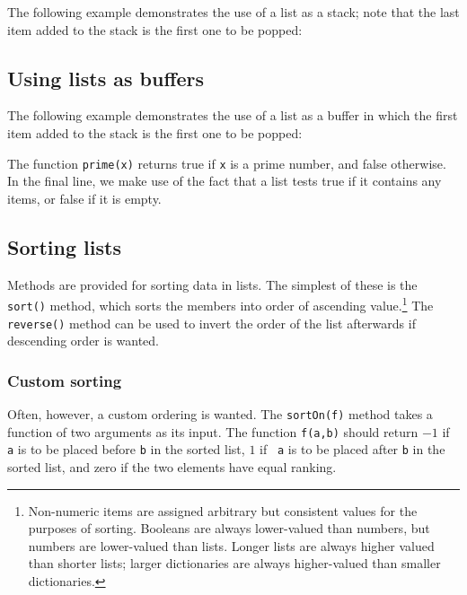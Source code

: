 The following example demonstrates the use of a list as a stack; note that the
last item added to the stack is the first one to be popped:

\vspace{3mm}

\vspace{3mm}

\subsection{Using lists as buffers}

The following example demonstrates the use of a list as a buffer in which the
first item added to the stack is the first one to be popped:

\vspace{3mm}

\vspace{3mm}

\noindent The function {\tt prime(x)} returns true if {\tt x} is a prime
number, and false otherwise. In the final line, we make use of the fact that a
list tests true if it contains any items, or false if it is empty.

\subsection{Sorting lists}

Methods are provided for sorting data in lists. The simplest of these is the
{\tt sort()} method, which sorts the members into order of ascending
value.\footnote{Non-numeric items are assigned arbitrary but consistent values
for the purposes of sorting.  Booleans are always lower-valued than numbers,
but numbers are lower-valued than lists. Longer lists are always higher valued
than shorter lists; larger dictionaries are always higher-valued than smaller
dictionaries.} The {\tt reverse()} method can be used to invert the order of
the list afterwards if descending order is wanted.

\vspace{3mm}

\vspace{3mm}

\subsubsection{Custom sorting}

Often, however, a custom ordering is wanted. The {\tt sortOn(f)} method takes a
function of two arguments as its input. The function {\tt f(a,b)} should return
$-1$ if {\tt a} is to be placed before {\tt b} in the sorted list, $1$ if {\tt
a} is to be placed after {\tt b} in the sorted list, and zero if the two
elements have equal ranking.

